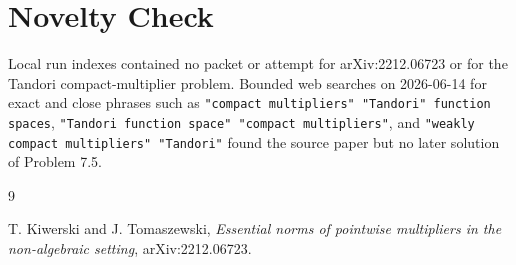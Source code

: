 \documentclass[11pt]{article}
\begin{document}
\section*{Novelty Check}

Local run indexes contained no packet or attempt for arXiv:2212.06723 or for
the Tandori compact-multiplier problem. Bounded web searches on 2026-06-14 for
exact and close phrases such as \texttt{"compact multipliers" "Tandori"
function spaces}, \texttt{"Tandori function space" "compact multipliers"}, and
\texttt{"weakly compact multipliers" "Tandori"} found the source paper but no
later solution of Problem 7.5.

\begin{thebibliography}{9}

T. Kiwerski and J. Tomaszewski,
\emph{Essential norms of pointwise multipliers in the non-algebraic setting},
arXiv:2212.06723.

\end{thebibliography}
\end{document}
